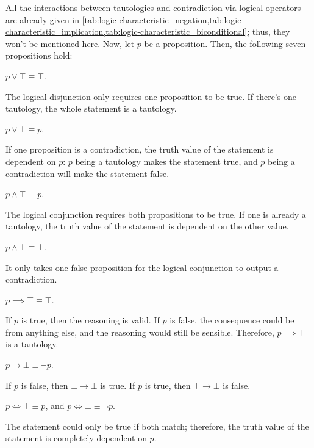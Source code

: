 All the interactions between tautologies and contradiction via logical operators are already given in \cref{tab:logic-characteristic_negation,tab:logic-characteristic_implication,tab:logic-characteristic_biconditional}; thus, they won't be mentioned here. Now, let $p$ be a proposition. Then, the following seven propositions hold:
\begin{prop}{}{}
  \(p \lor \top \equiv \top.\)
\end{prop}
The logical disjunction only requires one proposition to be true. If there's one tautology, the whole statement is a tautology.

\begin{prop}{}{}
  \(p \lor \bot \equiv p.\)
\end{prop}
If one proposition is a contradiction, the truth value of the statement is dependent on $p$: $p$ being a tautology makes the statement true, and $p$ being a contradiction will make the statement false.

\begin{prop}{}{}
  \(p \land \top \equiv p.\)
\end{prop}
The logical conjunction requires both propositions to be true. If one is already a tautology, the truth value of the statement is dependent on the other value.

\begin{prop}{}{}
  \(p \land \bot \equiv \bot.\)
\end{prop}
It only takes one false proposition for the logical conjunction to output a contradiction.

\begin{prop}{}{}
  \(p \implies \top \equiv \top.\)
\end{prop}
If $p$ is true, then the reasoning is valid. If $p$ is false, the consequence could be from anything else, and the reasoning would still be sensible. Therefore, $p \implies \top$ is a tautology.

\begin{prop}{}{}
  \(p \to \bot \equiv \neg p.\)
\end{prop}
If $p$ is false, then $\bot \to \bot$ is true. If $p$ is true, then $\top \to \bot$ is false.

\begin{prop}{}{}
  \(p \iff \top \equiv p\), and \(p \iff \bot \equiv \neg p.\)
\end{prop}
The statement could only be true if both match; therefore, the truth value of the statement is completely dependent on $p$.

